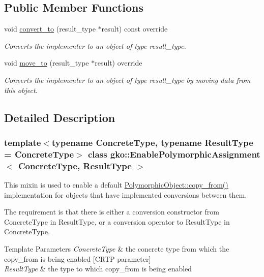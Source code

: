 \subsection*{Public Member Functions}
\begin{DoxyCompactItemize}
\item 
void \hyperlink{classgko_1_1EnablePolymorphicAssignment_a6b7e6872e96084636f8ab5091063ada8}{convert\+\_\+to} (result\+\_\+type $\ast$result) const override
\begin{DoxyCompactList}\small\item\em Converts the implementer to an object of type result\+\_\+type. \end{DoxyCompactList}\item 
void \hyperlink{classgko_1_1EnablePolymorphicAssignment_a0a4cf244139e7761d6a91c61e029810e}{move\+\_\+to} (result\+\_\+type $\ast$result) override
\begin{DoxyCompactList}\small\item\em Converts the implementer to an object of type result\+\_\+type by moving data from this object. \end{DoxyCompactList}\end{DoxyCompactItemize}


\subsection{Detailed Description}
\subsubsection*{template$<$typename Concrete\+Type, typename Result\+Type = Concrete\+Type$>$\newline
class gko\+::\+Enable\+Polymorphic\+Assignment$<$ Concrete\+Type, Result\+Type $>$}

This mixin is used to enable a default \hyperlink{classgko_1_1PolymorphicObject_a5e6f713938293cfbe788d00480eb4d81}{Polymorphic\+Object\+::copy\+\_\+from()} implementation for objects that have implemented conversions between them. 

The requirement is that there is either a conversion constructor from {\ttfamily Concrete\+Type} in {\ttfamily Result\+Type}, or a conversion operator to {\ttfamily Result\+Type} in {\ttfamily Concrete\+Type}.


\begin{DoxyTemplParams}{Template Parameters}
{\em Concrete\+Type} & the concrete type from which the copy\+\_\+from is being enabled \mbox{[}C\+R\+TP parameter\mbox{]} \\
\hline
{\em Result\+Type} & the type to which copy\+\_\+from is being enabled \\
\hline
\end{DoxyTemplParams}


